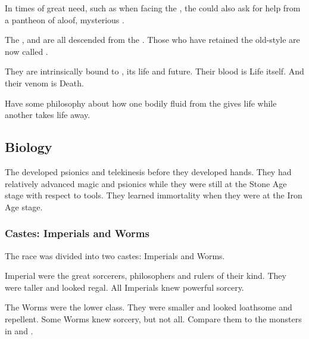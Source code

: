 In times of great need, such as when facing the \xzaishann, the \ophidians{} could also ask for help from a pantheon of aloof, mysterious . 

The \dragons, \quiljaaran{} and \nagae{} are all descended from the \ophidians.
Those who have retained the old-style \ophidian{} are now called \quo{\trueophidians}. 


They are intrinsically bound to \Miith{}, its life and future. Their blood is Life itself. And their venom is Death. 

Have some philosophy about how one bodily fluid from the \ophidians{} gives life while another takes life away. 









\subsection{Biology}
The \ophidians{} developed psionics and telekinesis before they developed hands. 
They had relatively advanced magic and psionics while they were still at the Stone Age stage with respect to tools. 
They learned immortality when they were at the Iron Age stage. 





\subsubsection{Castes: Imperials and Worms}
The \ophidian race was divided into two castes: 
Imperials and Worms.

Imperial \ophidians were the great sorcerers, philosophers and rulers of their kind.
They were taller and looked regal.
All Imperials knew powerful sorcery.

The Worms were the lower class. 
They were smaller and looked loathsome and repellent.
Some Worms knew sorcery, but not all. 
Compare them to the monsters in \cite{RobertEHoward:TheShadowKingdom} and \cite{RobertEHoward:WormsoftheEarth}. 

